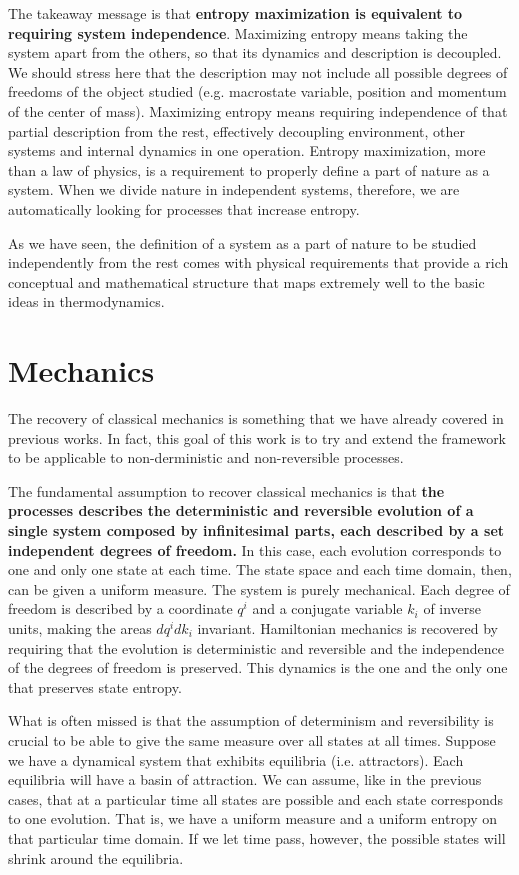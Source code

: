 \documentclass[letterpaper]{article}
\begin{document}
The takeaway message is that \textbf{entropy maximization is equivalent to requiring system independence}. Maximizing entropy means taking the system apart from the others, so that its dynamics and description is decoupled. We should stress here that the description may not include all possible degrees of freedoms of the object studied (e.g. macrostate variable, position and momentum of the center of mass). Maximizing entropy means requiring independence of that partial description from the rest, effectively decoupling environment, other systems and internal dynamics in one operation. Entropy maximization, more than a law of physics, is a requirement to properly define a part of nature as a system. When we divide nature in independent systems, therefore, we are automatically looking for processes that increase entropy.
 
As we have seen, the definition of a system as a part of nature to be studied independently from the rest comes with physical requirements that provide a rich conceptual and mathematical structure that maps extremely well to the basic ideas in thermodynamics.

\section{Mechanics}
The recovery of classical mechanics is something that we have already covered in previous works. In fact, this goal of this work is to try and extend the framework to be applicable to non-derministic and non-reversible processes.

The fundamental assumption to recover classical mechanics is that \textbf{the processes describes the deterministic and reversible evolution of a single system composed by infinitesimal parts, each described by a set independent degrees of freedom.} In this case, each evolution corresponds to one and only one state at each time. The state space and each time domain, then, can be given a uniform measure. The system is purely mechanical. Each degree of freedom is described by a coordinate $q^i$ and a conjugate variable $k_i$ of inverse units, making the areas $dq^idk_i$ invariant. Hamiltonian mechanics is recovered by requiring that the evolution is deterministic and reversible and the independence of the degrees of freedom is preserved. This dynamics is the one and the only one that preserves state entropy.

What is often missed is that the assumption of determinism and reversibility is crucial to be able to give the same measure over all states at all times. Suppose we have a dynamical system that exhibits equilibria (i.e. attractors). Each equilibria will have a basin of attraction. We can assume, like in the previous cases, that at a particular time all states are possible and each state corresponds to one evolution. That is, we have a uniform measure and a uniform entropy on that particular time domain. If we let time pass, however, the possible states will shrink around the equilibria. 
\end{document}
